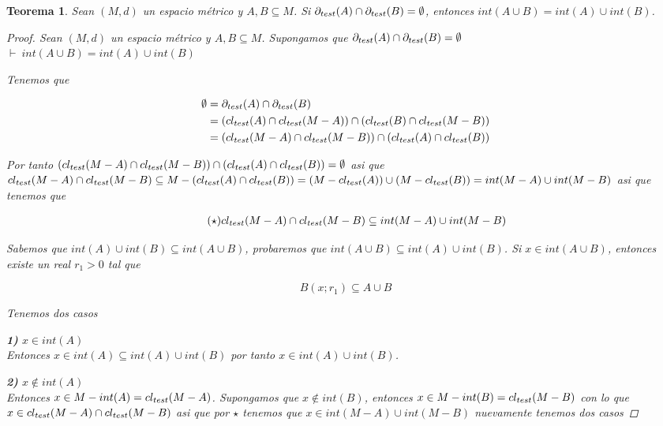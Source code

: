 \documentclass[oneside]{book} %
\theoremstyle{Teorema}
\newtheorem{Teorema}[Definicion]{Teorema}
\theoremstyle{Ejemplos}
\theoremstyle{[Obs]}
\def \test {test}
\newcommand{\cerradura}[2][\test]{\ifx \test #1 {\overline{#2}} \else {cl_{#1}(#2)} \fi} %
\newcommand{\frontera}[2][\test]{\ifx \test #1 {\partial(#2)} \else {\partial_{#1}(#2)} \fi} %
\renewcommand{\{}{\left\lbrace} %
\renewcommand{\}}{\right\rbrace} %
\renewcommand{\u}{\cup} %
\newcommand{\n}{\cap} %
\renewcommand{\sc}{\subseteq} %
\newcommand{\pd}{$\vdash\ $} %
\begin{document}
			\begin{Teorema}\setlength{\parindent}{0em}
			
				Sean $(M, d)$ un espacio métrico y $A, B \sc M$. Si $\frontera{A} \n \frontera{B} = \emptyset$, entonces $int(A \u B) = int(A) \u int(B)$.
			
				\begin{proof}

					Sean $(M, d)$ un espacio métrico y $A, B \sc M$. Supongamos que $\frontera{A} \n \frontera{B} = \emptyset$ \\ 
					\pd $int(A \u B) = int(A) \u int(B)$ 

					Tenemos que 

					\begin{align*}
						\emptyset &= \frontera{A} \n \frontera{B} \\ 
						&= (\cerradura{A} \n \cerradura{M - A}) \n (\cerradura{B} \n \cerradura{M - B}) \\ 
						&= (\cerradura{M - A} \n \cerradura{M - B}) \n (\cerradura{A} \n \cerradura{B})
					\end{align*}

					Por tanto $(\cerradura{M - A} \n \cerradura{M - B}) \n (\cerradura{A} \n \cerradura{B}) = \emptyset$ asi que $\cerradura{M - A} \n \cerradura{M - B} \sc M - (\cerradura{A} \n \cerradura{B}) = (M - \cerradura{A}) \u (M - \cerradura{B}) = int(M - A) \u int(M - B)$ asi que tenemos que 

					\begin{align*}\tag{$\star$}
						\cerradura{M - A} \n \cerradura{M - B} \sc int(M - A) \u int(M - B)
					\end{align*}

					Sabemos que $int(A) \u int(B) \sc int(A \u B)$, probaremos que $int(A \u B) \sc int(A) \u int(B)$. Si $x \in int(A \u B)$, entonces existe un real $r_1 > 0$ tal que 
					
					\begin{equation*}\tag{$\star\star$}
						B(x;r_1) \sc A \u B
					\end{equation*}
					
					Tenemos dos casos 

					\textbf{1)} $x \in int(A)$ \\ 
					Entonces $x \in int(A) \sc int(A) \u int(B)$ por tanto $x \in int(A) \u int(B)$.

					\textbf{2)} $x \notin int(A)$ \\ 
					Entonces $x \in M - int(A) = \cerradura{M - A}$. Supongamos que $x \notin int(B)$, entonces $x \in M - int(B) = \cerradura{M - B}$ con lo que $x \in \cerradura{M - A} \n \cerradura{M - B}$ asi que por $\star$ tenemos que $x \in int(M - A) \u int(M - B)$ nuevamente tenemos dos casos 


\end{proof}
\end{Teorema}
\end{document}
